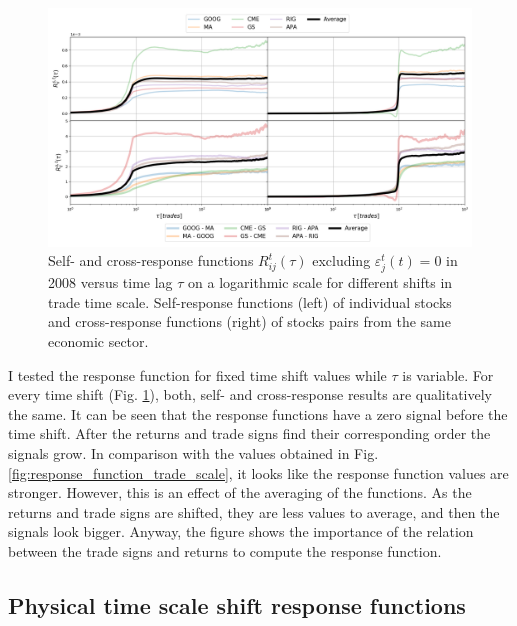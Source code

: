 \begin{figure}[htbp]
    \centering
    \includegraphics[width=\textwidth]{figures/04_shift_responses_trade.png}
    \caption{Self- and cross-response functions $R^{t}_{ij}\left(\tau\right)$
             excluding $\varepsilon^{t}_{j}\left(t\right) = 0$ in 2008 versus
             time lag $\tau$ on a logarithmic scale for different shifts in
             trade time scale. Self-response functions (left) of individual
             stocks and cross-response functions (right) of stocks pairs from
             the same economic sector.}
    \label{fig:shift_responses_trade_scale}
\end{figure}

I tested the response function for fixed time shift values while $\tau$ is
variable. For every time shift (Fig. \ref{fig:shift_responses_trade_scale}),
both, self- and cross-response results are qualitatively the same. It can be
seen that the response functions have a zero signal before the time shift.
After the returns and trade signs find their corresponding order the signals
grow. In comparison with the values obtained in Fig.
\ref{fig:response_function_trade_scale}, it looks like the response function
values are stronger. However, this is an effect of the averaging of the
functions. As the returns and trade signs are shifted, they are less values to
average, and then the signals look bigger. Anyway, the figure shows the
importance of the relation between the trade signs and returns to compute the
response function.

\subsection{Physical time scale shift response functions}
\label{subsec:time_shift_physical}

